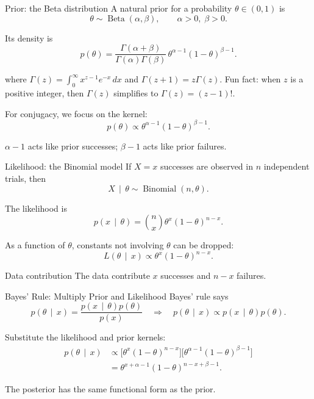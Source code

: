 \documentclass[aspectratio=43,11pt]{beamer}
\newcommand{\BetaDist}{\operatorname{Beta}}
\newcommand{\Bin}{\operatorname{Binomial}}
\newcommand{\given}{\,\mid\,}
\begin{document}
  \begin{frame}{Prior: the Beta distribution}
    A natural prior for a probability $\theta \in (0,1)$ is
    \[
    \theta \sim \BetaDist(\alpha,\beta), \qquad \alpha>0,\; \beta>0.
    \]

    Its density is
    \[
    p(\theta)=\frac{\Gamma(\alpha+\beta)}{\Gamma(\alpha)\Gamma(\beta)}\,\theta^{\alpha-1}(1-\theta)^{\beta-1}.
    \]
    
    {
    \footnotesize
    where
    $
    \Gamma(z)=\int_{0}^{\infty} x^{z-1}e^{-x}\,dx
    $
    and
    $
    \Gamma(z+1)=z\Gamma(z).
    $
    Fun fact: when \(z\) is a positive integer, then \(\Gamma(z)\) simplifies to
    $
    \Gamma(z)=(z-1)!.
    $
    }
    
    \vspace{.1cm}
    
    For conjugacy, we focus on the kernel:
    \[
    p(\theta) \propto \theta^{\alpha-1}(1-\theta)^{\beta-1}.
    \]

    \alert{$\alpha-1$ acts like prior successes; $\beta-1$ acts like prior failures.}
  \end{frame}

  \begin{frame}{Likelihood: the Binomial model}
    If $X=x$ successes are observed in $n$ independent trials, then
    \[
    X \given \theta \sim \Bin(n,\theta).
    \]

    The likelihood is
    \[
    p(x \given \theta)=\binom{n}{x}\theta^x(1-\theta)^{n-x}.
    \]

    As a function of $\theta$, constants not involving $\theta$ can be dropped:
    \[
    L(\theta \given x) \propto \theta^x(1-\theta)^{n-x}.
    \]

    \begin{block}{Data contribution}
      The data contribute $x$ successes and $n-x$ failures.
    \end{block}
  \end{frame}

  \begin{frame}{Bayes' Rule: Multiply Prior and Likelihood}
    Bayes' rule says
    \[
    p(\theta \given x)=\frac{p(x \given \theta)p(\theta)}{p(x)}
    \quad \Longrightarrow \quad
    p(\theta \given x) \propto p(x \given \theta)p(\theta).
    \]

    Substitute the likelihood and prior kernels:
    \begin{align*}
      p(\theta \given x)
      &\propto \Big[\theta^x(1-\theta)^{n-x}\Big]
      \Big[\theta^{\alpha-1}(1-\theta)^{\beta-1}\Big] \\
      &= \theta^{x+\alpha-1}(1-\theta)^{n-x+\beta-1}.
    \end{align*}

    \begin{block}{}
      The posterior has the same functional form as the prior.
    \end{block}
  \end{frame}
\end{document}
